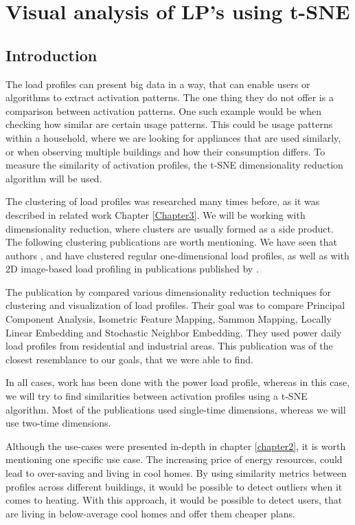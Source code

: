 \chapter{Visual analysis of LP's using t-SNE} 

\label{chapter5} 

\section{Introduction}

The load profiles can present big data in a way, that can enable users or algorithms to extract activation patterns.
The one thing they do not offer is a comparison between activation patterns.
One such example would be when checking how similar are certain usage patterns.
This could be usage patterns within a household, where we are looking for appliances that are used similarly,
or when observing multiple buildings and how their consumption differs. 
To measure the similarity of activation profiles, the t-SNE dimensionality reduction algorithm will be used.

The clustering of load profiles was researched many times before, as it was described in related work Chapter \ref{Chapter3}.
We will be working with dimensionality reduction, where clusters are usually formed as a side product.
The following clustering publications are worth mentioning.
We have seen that authors \cite{GERBEC2005}, \cite{Jeong2021} and \cite{Joana2012} have clustered regular one-dimensional load profiles, as well as with 2D image-based load profiling in publications published by \cite{Park2019}. 

The publication by \cite{sne_energ} compared various dimensionality reduction techniques for clustering and visualization of load profiles.
Their goal was to compare Principal Component Analysis, Isometric Feature Mapping, Sammon Mapping, Locally Linear Embedding and Stochastic Neighbor Embedding.
They used power daily load profiles from residential and industrial areas.
This publication was of the closest resemblance to our goals, that we were able to find. 

In all cases, work has been done with the power load profile, whereas in this case, we will try to find similarities between activation profiles using a t-SNE algorithm.
Most of the publications used single-time dimensions, whereas we will use two-time dimensions.

Although the use-cases were presented in-depth in chapter \ref{chapter2}, it is worth mentioning one specific use case.
The increasing price of energy resources, could lead to over-saving and living in cool homes.
By using similarity metrics between profiles across different buildings, it would be possible to detect outliers when it comes to heating. 
With this approach, it would be possible to detect users, that are living in below-average cool homes and offer them cheaper plans. 


